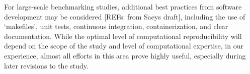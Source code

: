 \documentclass[12pt, a4paper]{article}
\begin{document}
For large-scale benchmarking studies, additional best practices from software development may be considered [REFs: from Saeys draft], including the use of `makefiles', unit tests, continuous integration, containerization, and clear documentation. While the optimal level of computational reproducibility will depend on the scope of the study and level of computational expertise, in our experience, almost all efforts in this area prove highly useful, especially during later revisions to the study.















\newpage


\singlespacing
\footnotesize




\end{document}
